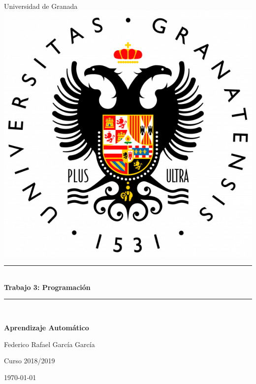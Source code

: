 \documentclass[12pt,spanish]{article} %
\begin{document}
\abovedisplayshortskip=0pt
\belowdisplayshortskip=0.0cm
\abovedisplayskip=0.0cm
\belowdisplayskip=0pt



\begin{titlepage}

\newcommand{\HRule}{\rule{\linewidth}{0.5mm}} %

\center %

\LARGE Universidad de Granada\\[1cm] %

\includegraphics[scale=.2]{logo}

\HRule \\[0.5cm]
{ \LARGE \bfseries Trabajo 3: Programación}\\[0.1cm] %
\HRule \\[0.5cm]

\vspace{1.0cm}

\Large \textbf{Aprendizaje Automático}

\vspace{0.75cm}

\large Federico Rafael García García

\large Curso 2018/2019



{\today} %


\vfill %

\end{titlepage}
\end{document}
